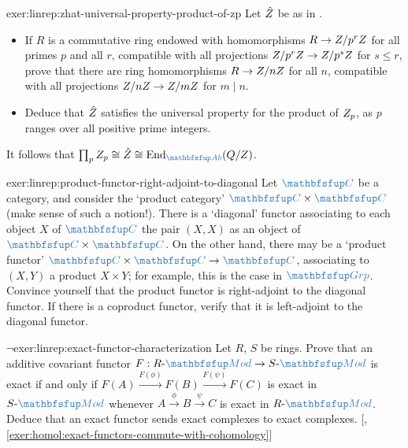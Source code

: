 \begin{exer}{}{exer:linrep:zhat-universal-property-product-of-zp}
  Let $\hat{Z}$ be as in
  .
  \begin{itemize}
  \item If $R$ is a commutative ring endowed with homomorphisms
    $R \to Z/p^rZ$ for all primes $p$ and all $r$, compatible with
    all projections $Z/p^rZ \to Z/p^sZ$ for $s \leq r$, prove that
    there are ring homomorphisms $R \to Z/nZ$ for all $n$,
    compatible with all projections $Z/nZ \to Z/mZ$ for
    $m \mid n$.
  \item Deduce that $\hat{Z}$ satisfies the universal property for
    the product of $Z_p$, as $p$ ranges over all positive prime
    integers.
  \end{itemize}
  It follows that
  $\prod_p \Z_p \cong \hat{\Z} \cong
  \mathrm{End}_{\categ{Ab}}(\Q/\Z)$.
\end{exer}

\begin{exer}{}{exer:linrep:product-functor-right-adjoint-to-diagonal}
  Let $\categ{C}$ be a category, and consider the `product category'
  $\categ{C} \times \categ{C}$ (make sense of such a notion!). There
  is a `diagonal' functor associating to each object $X$ of
  $\categ{C}$ the pair $(X, X)$ as an object of
  $\categ{C} \times \categ{C}$. On the other hand, there may be a
  `product functor' $\categ{C} \times \categ{C} \to \categ{C}$,
  associating to $(X, Y)$ a product $X \times Y$; for example, this is
  the case in $\categ{Grp}$. Convince yourself that the product
  functor is right-adjoint to the diagonal functor. If there is a
  coproduct functor, verify that it is left-adjoint to the diagonal
  functor.
\end{exer}

\begin{exer}{$\lnot$}{exer:linrep:exact-functor-characterization}
  Let $R$, $S$ be rings. Prove that an additive covariant functor
  $F : R\text{-}\categ{Mod} \to S\text{-}\categ{Mod}$ is exact if and
  only if $F(A) \xrightarrow{F(\phi)} F(B) \xrightarrow{F(\psi)} F(C)$
  is exact in $S\text{-}\categ{Mod}$ whenever
  $A \xrightarrow{\phi} B \xrightarrow{\psi} C$ is exact in
  $R\text{-}\categ{Mod}$. Deduce that an exact functor sends exact
  complexes to exact
  complexes. [,
  \ref{exer:homol:exact-functors-commute-with-cohomology}]
\end{exer}


